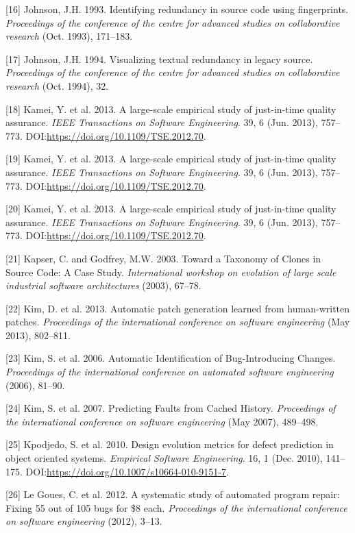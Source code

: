 \documentclass[sigconf]{acmart}
\begin{document}
[16] Johnson, J.H. 1993. Identifying redundancy in source code using
fingerprints. \emph{Proceedings of the conference of the centre for
advanced studies on collaborative research} (Oct. 1993), 171--183.


[17] Johnson, J.H. 1994. Visualizing textual redundancy in legacy
source. \emph{Proceedings of the conference of the centre for advanced
studies on collaborative research} (Oct. 1994), 32.


[18] Kamei, Y. et al. 2013. A large-scale empirical study of
just-in-time quality assurance. \emph{IEEE Transactions on Software
Engineering}. 39, 6 (Jun. 2013), 757--773.
DOI:\url{https://doi.org/10.1109/TSE.2012.70}.


[19] Kamei, Y. et al. 2013. A large-scale empirical study of
just-in-time quality assurance. \emph{IEEE Transactions on Software
Engineering}. 39, 6 (Jun. 2013), 757--773.
DOI:\url{https://doi.org/10.1109/TSE.2012.70}.


[20] Kamei, Y. et al. 2013. A large-scale empirical study of
just-in-time quality assurance. \emph{IEEE Transactions on Software
Engineering}. 39, 6 (Jun. 2013), 757--773.
DOI:\url{https://doi.org/10.1109/TSE.2012.70}.


[21] Kapser, C. and Godfrey, M.W. 2003. Toward a Taxonomy of Clones
in Source Code: A Case Study. \emph{International workshop on evolution
of large scale industrial software architectures} (2003), 67--78.


[22] Kim, D. et al. 2013. Automatic patch generation learned from
human-written patches. \emph{Proceedings of the international conference
on software engineering} (May 2013), 802--811.


[23] Kim, S. et al. 2006. Automatic Identification of
Bug-Introducing Changes. \emph{Proceedings of the international
conference on automated software engineering} (2006), 81--90.


[24] Kim, S. et al. 2007. Predicting Faults from Cached History.
\emph{Proceedings of the international conference on software
engineering} (May 2007), 489--498.


[25] Kpodjedo, S. et al. 2010. Design evolution metrics for defect
prediction in object oriented systems. \emph{Empirical Software
Engineering}. 16, 1 (Dec. 2010), 141--175.
DOI:\url{https://doi.org/10.1007/s10664-010-9151-7}.


[26] Le Goues, C. et al. 2012. A systematic study of automated
program repair: Fixing 55 out of 105 bugs for \$8 each.
\emph{Proceedings of the international conference on software
engineering} (2012), 3--13.
\end{document}

